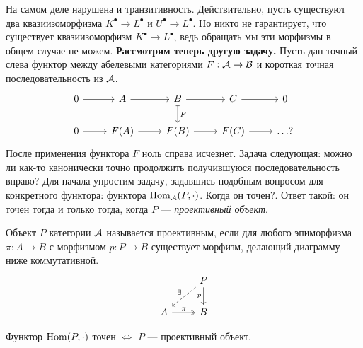 \documentclass[../main.tex]{subfiles}
\begin{document}
На самом деле нарушена и транзитивность. Действительно, пусть существуют два квазиизоморфизма $K^\bullet \to L^\bullet$ и $U^\bullet \to L^\bullet$. Но никто не гарантирует, что существует квазиизоморфизм $K^\bullet\to L^\bullet$, ведь обращать мы эти морфизмы в общем случае не можем.
\textbf{Рассмотрим теперь другую задачу.} Пусть дан точный слева функтор между абелевыми категориями $F:\mathcal{A} \to \mathcal{B}$ и короткая точная последовательность из $\mathcal{A}$.
\begin{equation*}
\begin{tikzcd}
	0 & A & B & C & 0 \\
	0 & {F(A)} & {F(B)} & {F(C)} & {\ldots ?}
	\arrow[from=1-1, to=1-2]
	\arrow[from=1-2, to=1-3]
	\arrow[from=1-3, to=1-4]
	\arrow[from=1-4, to=1-5]
	\arrow[from=2-1, to=2-2]
	\arrow[from=2-2, to=2-3]
	\arrow[from=2-3, to=2-4]
	\arrow[from=2-4, to=2-5]
	\arrow["F", maps to, from=1-3, to=2-3]
\end{tikzcd}
\end{equation*}
После применения функтора $F$ ноль справа исчезнет. Задача следующая: можно ли как-то канонически точно продолжить получившуюся последовательность вправо?
Для начала упростим задачу, задавшись подобным вопросом для конкретного функтора: функтора $\operatorname{Hom}_{\mathcal{A}}(P, \cdot)$. Когда он точен?. Ответ такой: он точен тогда и только тогда, когда $P$ --- \emph{проективный объект}.
\begin{to_def}
Объект $P$ категории $\mathcal{A}$ называется проективным, если для любого эпиморфизма $\pi: A\to B$ с морфизмом $p:P\to B$ существует морфизм, делающий диаграмму ниже коммутативной.
\begin{equation}\label{projective_def_diagram}
\begin{tikzcd}
	& P \\
	A & B
	\arrow["\pi", two heads, from=2-1, to=2-2]
	\arrow["p"', from=1-2, to=2-2]
	\arrow["\exists"', dashed, from=1-2, to=2-1]
\end{tikzcd}
\end{equation}
\end{to_def}
\begin{to_suj}\label{home_exact_proj}
Функтор $\operatorname{Hom}(P, \cdot)$ точен $\iff$ $P$ --- проективный объект.
\end{to_suj}
\end{document}

